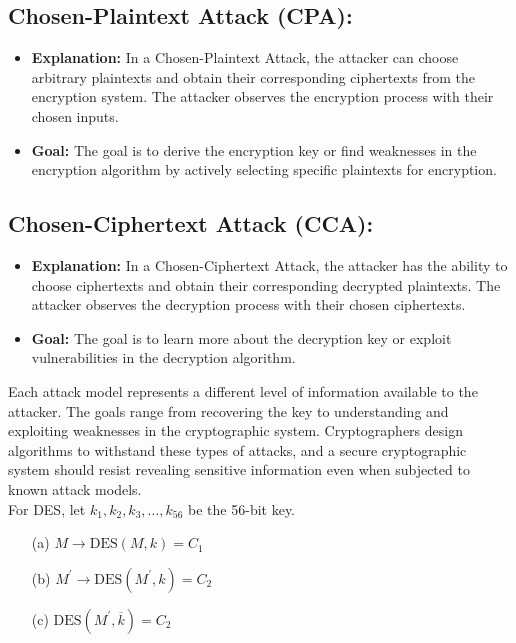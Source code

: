 \documentclass[11pt]{article}
\begin{document}
\subsection*{Chosen-Plaintext Attack (CPA):}
\begin{itemize}
    \item \textbf{Explanation:} In a Chosen-Plaintext Attack, the attacker can choose arbitrary plaintexts and obtain their corresponding ciphertexts from the encryption system. The attacker observes the encryption process with their chosen inputs.
    \item \textbf{Goal:} The goal is to derive the encryption key or find weaknesses in the encryption algorithm by actively selecting specific plaintexts for encryption.
\end{itemize}

\subsection*{Chosen-Ciphertext Attack (CCA):}
\begin{itemize}
    \item \textbf{Explanation:} In a Chosen-Ciphertext Attack, the attacker has the ability to choose ciphertexts and obtain their corresponding decrypted plaintexts. The attacker observes the decryption process with their chosen ciphertexts.
    \item \textbf{Goal:} The goal is to learn more about the decryption key or exploit vulnerabilities in the decryption algorithm.
\end{itemize}

Each attack model represents a different level of information available to the attacker. The goals range from recovering the key to understanding and exploiting weaknesses in the cryptographic system. Cryptographers design algorithms to withstand these types of attacks, and a secure cryptographic system should resist revealing sensitive information even when subjected to known attack models.\\

For DES, let $k_1, k_2, k_3, \ldots, k_{56}$ be the 56-bit key.

\begin{enumerate}
    \item[(a)] $M \rightarrow \text{DES}(M, k) = C_1$
    \item[(b)] $M^\prime \rightarrow \text{DES}(M^\prime, k) = C_2$
    \item[(c)] $\text{DES}(M^\prime, \overline{k}) = C_2$
\end{enumerate}
\end{document}
